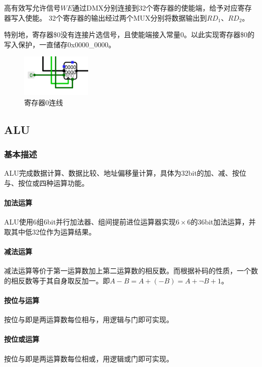 \documentclass[main.tex]{subfiles}
\begin{document}
高有效写允许信号$WE$通过DMX分别连接到32个寄存器的使能端，给予对应寄存器写入使能。
32个寄存器的输出经过两个MUX分别将数据输出到$RD_1$、$RD_2$。

特别地，寄存器\$0没有连接片选信号，且使能端接入常量0。以此实现寄存器\$0的写入保护，一直储存0x0000\_0000。
\begin{figure}[h]
\centering
\includegraphics[width=0.3\textwidth]{images/reg0-circuit.png}
\caption{寄存器0连线}
\end{figure}

\clearpage
\subsection{ALU}
\subsubsection{基本描述}
ALU完成数据计算、数据比较、地址偏移量计算，具体为32bit的加、减、按位与、按位或四种运算功能。
\paragraph{加法运算}
ALU使用6组6bit并行加法器、组间提前进位运算器实现$6 \times 6$的36bit加法运算，并取其中低32位作为运算结果。
\paragraph{减法运算}
减法运算等价于第一运算数加上第二运算数的相反数。而根据补码的性质，一个数的相反数等于其自身取反加一。即$A-B = A+(-B) = A+\neg B+1$。
\paragraph{按位与运算}
按位与即是两运算数每位相与，用逻辑与门即可实现。
\paragraph{按位或运算}
按位与即是两运算数每位相或，用逻辑或门即可实现。
\end{document}
